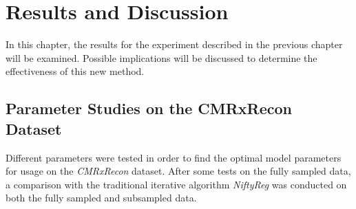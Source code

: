 \documentclass[english,version-2022-01]{uzl-thesis} %
\begin{document}

\chapter{Results and Discussion} \label{Ch:ResultsDiscussion}
In this chapter, the results for the experiment described in the previous chapter will be examined. Possible implications will be discussed to determine the effectiveness of this new method.



\section{Parameter Studies on the CMRxRecon Dataset} \label{Sec:ParameterStudies}
Different parameters were tested in order to find the optimal model parameters for usage on the \emph{CMRxRecon} dataset. After some tests on the fully sampled data, a comparison with the traditional iterative algorithm \emph{NiftyReg} was conducted on both the fully sampled and subsampled data.
\end{document}
